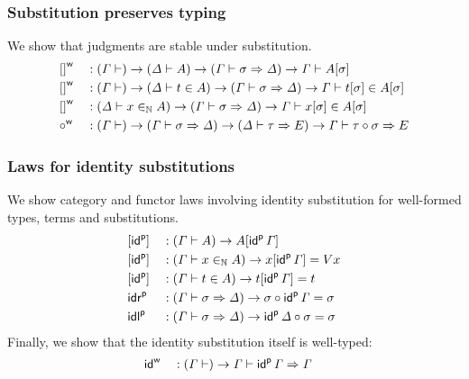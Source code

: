 \subsubsection{Substitution preserves typing}
  We show that judgments are stable under substitution.
\begin{alignat*}{5}
  & \wf{[]} && : (\GG \vdash)\ra(\GD \vdash A)\ra
  (\GG \vdash \sigma \Rightarrow \GD) \ra
  \GG \vdash A [ \sigma ]
  \\
  & \wf{[]} && : (\GG \vdash)\ra(\GD \vdash t \in A)\ra
  (\GG \vdash \sigma \Rightarrow \GD) \ra
  \GG \vdash t [\sigma] \in A [ \sigma ]
  \\
  & \wf{[]} && : (\GD \vdash x \invar A)\ra
  (\GG \vdash \sigma \Rightarrow \GD) \ra
  \GG \vdash x [\sigma] \in A [ \sigma ]
  \\
  & \wf{{\circ}} && :
  (\GG \vdash) \ra
  (\GG \vdash \sigma \Rightarrow \GD) \ra
  (\GD \vdash \tau \Rightarrow E) \ra
  \GG \vdash \tau \circ \sigma \Rightarrow E
  \end{alignat*}
\subsubsection{Laws for identity substitutions}
We show category and functor laws involving identity substitution for
well-formed types, terms and substitutions.
\begin{alignat*}{5}
  & [\idu] && : (\GG \vdash A)\ra A [ \idu\,\GG]  \\
  & [\idu] && : (\GG \vdash x \invar A)\ra x [ \idu\,\GG] = V x \\
  & [\idu] && : (\GG \vdash t \in A)\ra t [ \idu\,\GG] = t \\
  & \idru && : (\GG \vdash \sigma \Rightarrow\GD)\ra \sigma \circ \idu\,\GG = \sigma \\
  & \idlu && : (\GG \vdash \sigma \Rightarrow\GD)\ra \idu\,\GD\circ \sigma = \sigma
  \end{alignat*}
Finally, we show that the identity substitution itself is well-typed:
  \begin{alignat*}{5}
  & \idw && : (\GG \vdash)\ra \GG \vdash \idu\,\GG \Rightarrow \GG
  \end{alignat*}



